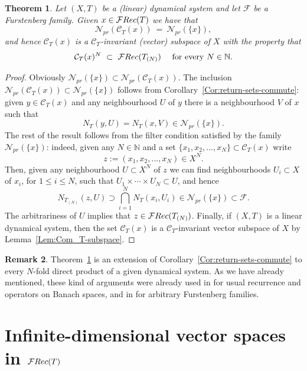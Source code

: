 \documentclass[openright,11pt]{article}
\theoremstyle{plain}
\newtheorem{theorem}{Theorem}[section]
\theoremstyle{definition}
\newtheorem{remark}[theorem]{Remark}
\newcommand{\NN}{\mathbb{N}}
\newcommand{\Fc}{\mathcal{F}}
\newcommand{\Nc}{\mathcal{N}}
\newcommand{\Rec}{\textup{Rec}}
\newcommand{\Com}{\mathcal{C}}
\begin{document}
\begin{theorem}\label{The:F-rec-commute}
	Let $(X,T)$ be a (linear) dynamical system and let $\Fc$ be a Furstenberg family. Given $x \in \Fc\Rec(T)$ we have that
	\[
	\Nc_{pr}(\Com_T(x)) \ = \ \Nc_{pr}(\{x\}),
	\]
	and hence $\Com_T(x)$ is a $\Com_T$-invariant (vector) subspace of $X$ with the property that
	\[
	\Com_T(x)^N \ \subset \ \Fc\Rec(T_{(N)}) \quad \text{ for every } N \in \NN.
	\]
\end{theorem}
\begin{proof}
	Obviously $\Nc_{pr}(\{x\}) \subset \Nc_{pr}(\Com_T(x))$. The inclusion $\Nc_{pr}(\Com_T(x)) \subset \Nc_{pr}(\{x\})$ follows from Corollary~\ref{Cor:return-sets-commute}: given $y \in \Com_T(x)$ and any neighbourhood $U$ of $y$ there is a neighbourhood $V$ of $x$ such that
	\[
	N_T(y,U) = N_T(x,V) \in \Nc_{pr}(\{x\}).
	\]
	The rest of the result follows from the filter condition satisfied by the family $\Nc_{pr}(\{x\})$: indeed, given any $N \in \NN$ and a set $\{x_1,x_2,...,x_N\} \subset \Com_T(x)$ write
	\[
	z := (x_1,x_2,...,x_N) \in X^N.
	\]
	Then, given any neighbourhood $U \subset X^N$ of $z$ we can find neighbourhoods $U_i \subset X$ of $x_i$, for $1\leq i\leq N$, such that $U_1\times\cdots\times U_N \subset U$, and hence
	\[
	N_{T_{(N)}}(z,U) \supset \bigcap_{i=1}^N N_T(x_i,U_i) \in \Nc_{pr}(\{x\}) \subset \Fc.
	\]
	The arbitrariness of $U$ implies that $z \in \Fc\Rec(T_{(N)})$. Finally, if $(X,T)$ is a linear dynamical system, then the set $\Com_T(x)$ is a $\Com_T$-invariant vector subspace of $X$ by Lemma~\ref{Lem:Com_T-subspace}.
\end{proof}

\begin{remark}
	Theorem~\ref{The:F-rec-commute} is an extension of Corollary~\ref{Cor:return-sets-commute} to every $N$-fold direct product of a given dynamical system. As we have already mentioned, these kind of arguments were already used in \cite[Theorem~9.1]{CoMaPa2014} for usual recurrence and operators on Banach spaces, and in \cite[Proposition~3.8]{CarMur2022_arXiv} for arbitrary Furstenberg families.
\end{remark}



\section{Infinite-dimensional vector spaces in $\Fc\Rec(T)$}\label{Sec:5lin+dense.lin}
\end{document}
